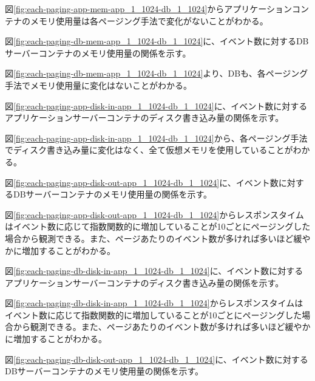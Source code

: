 \documentclass[../../../../main]{subfiles}
\begin{document}
    

    図\ref{fig:each-paging-app-mem-app_1_1024-db_1_1024}からアプリケーションコンテナのメモリ使用量は各ページング手法で変化がないことがわかる。

    図\ref{fig:each-paging-db-mem-app_1_1024-db_1_1024}に、イベント数に対するDBサーバーコンテナのメモリ使用量の関係を示す。

    

    図\ref{fig:each-paging-db-mem-app_1_1024-db_1_1024}より、DBも、各ページング手法でメモリ使用量に変化はないことがわかる。

    \label{subsubsubsec:result-each-paging-only-limit-disk-in}

    図\ref{fig:each-paging-app-disk-in-app_1_1024-db_1_1024}に、イベント数に対するアプリケーションサーバーコンテナのディスク書き込み量の関係を示す。

    

    図\ref{fig:each-paging-app-disk-in-app_1_1024-db_1_1024}から、各ページング手法でディスク書き込み量に変化はなく、全て仮想メモリを使用していることがわかる。

    図\ref{fig:each-paging-app-disk-out-app_1_1024-db_1_1024}に、イベント数に対するDBサーバーコンテナのメモリ使用量の関係を示す。

    

    図\ref{fig:each-paging-app-disk-out-app_1_1024-db_1_1024}からレスポンスタイムはイベント数に応じて指数関数的に増加していることが10ごとにページングした場合から観測できる。また、ページあたりのイベント数が多ければ多いほど緩やかに増加することがわかる。

    図\ref{fig:each-paging-db-disk-in-app_1_1024-db_1_1024}に、イベント数に対するアプリケーションサーバーコンテナのディスク書き込み量の関係を示す。

    

    図\ref{fig:each-paging-db-disk-in-app_1_1024-db_1_1024}からレスポンスタイムはイベント数に応じて指数関数的に増加していることが10ごとにページングした場合から観測できる。また、ページあたりのイベント数が多ければ多いほど緩やかに増加することがわかる。

    図\ref{fig:each-paging-db-disk-out-app_1_1024-db_1_1024}に、イベント数に対するDBサーバーコンテナのメモリ使用量の関係を示す。
\end{document}
